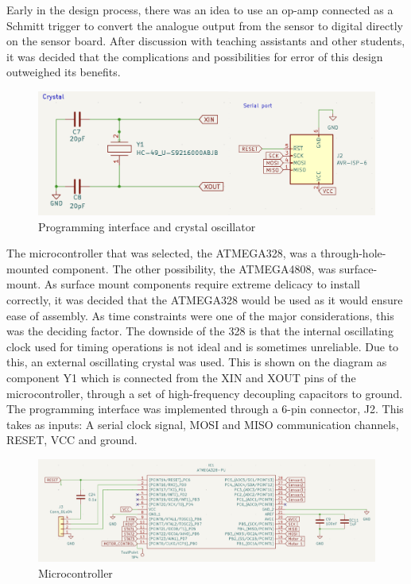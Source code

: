 \documentclass{article}
\begin{document}
Early in the design process, there was an idea to use an op-amp connected as a Schmitt trigger to convert the analogue output from the sensor to digital directly on the sensor board. After discussion with teaching assistants and other students, it was decided that the complications and possibilities for error of this design outweighed its benefits. 

 

\begin{figure}[H]
    \centering
    \includegraphics[width=0.7\linewidth]{REPORT/Crystal.png}
    \caption{Programming interface and crystal oscillator}
    \label{fig:Crystal}
\end{figure}

The microcontroller that was selected, the ATMEGA328, was a through-hole-mounted component. The other possibility, the ATMEGA4808, was surface-mount. As surface mount components require extreme delicacy to install correctly, it was decided that the ATMEGA328 would be used as it would ensure ease of assembly. As time constraints were one of the major considerations, this was the deciding factor. The downside of the 328 is that the internal oscillating clock used for timing operations is not ideal and is sometimes unreliable. Due to this, an external oscillating crystal was used. This is shown on the diagram as component Y1 which is connected from the XIN and XOUT pins of the microcontroller, through a set of high-frequency decoupling capacitors to ground. 
\\

The programming interface was implemented through a 6-pin connector, J2. This takes as inputs: A serial clock signal, MOSI and MISO communication channels, RESET, VCC and ground. 

\begin{figure}[H]
    \centering
    \includegraphics[width=0.83\linewidth]{REPORT/MicroCon.png}
    \caption{Microcontroller}
    \label{fig:Microcontroller}
\end{figure}
\end{document}
